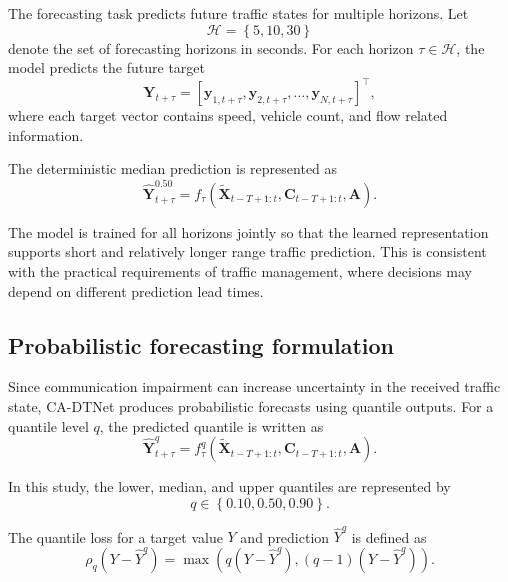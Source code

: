 \documentclass[pdflatex,sn-mathphys-num]{sn-jnl}%
\theoremstyle{thmstyleone}%
\theoremstyle{thmstyletwo}%
\theoremstyle{thmstylethree}%
\begin{document}
The forecasting task predicts future traffic states for multiple horizons. Let
\begin{equation}
    \mathcal{H} = \left\{5, 10, 30\right\}
\end{equation}
denote the set of forecasting horizons in seconds. For each horizon \(\tau \in \mathcal{H}\), the model predicts the future target
\begin{equation}
    \mathbf{Y}_{t+\tau}
    =
    \left[
    \mathbf{y}_{1,t+\tau},
    \mathbf{y}_{2,t+\tau},
    \ldots,
    \mathbf{y}_{N,t+\tau}
    \right]^{\top},
\end{equation}
where each target vector contains speed, vehicle count, and flow related information.

The deterministic median prediction is represented as
\begin{equation}
    \widehat{\mathbf{Y}}_{t+\tau}^{0.50}
    =
    f_{\tau}
    \left(
    \widetilde{\mathbf{X}}_{t-T+1:t},
    \mathbf{C}_{t-T+1:t},
    \mathbf{A}
    \right).
\end{equation}

The model is trained for all horizons jointly so that the learned representation supports short and relatively longer range traffic prediction. This is consistent with the practical requirements of traffic management, where decisions may depend on different prediction lead times.

\subsection{Probabilistic forecasting formulation}

Since communication impairment can increase uncertainty in the received traffic state, CA-DTNet produces probabilistic forecasts using quantile outputs. For a quantile level \(q\), the predicted quantile is written as
\begin{equation}
    \widehat{\mathbf{Y}}_{t+\tau}^{q}
    =
    f_{\tau}^{q}
    \left(
    \widetilde{\mathbf{X}}_{t-T+1:t},
    \mathbf{C}_{t-T+1:t},
    \mathbf{A}
    \right).
\end{equation}

In this study, the lower, median, and upper quantiles are represented by
\begin{equation}
    q \in \left\{0.10, 0.50, 0.90\right\}.
\end{equation}

The quantile loss for a target value \(Y\) and prediction \(\widehat{Y}^{q}\) is defined as
\begin{equation}
    \rho_{q}
    \left(
    Y - \widehat{Y}^{q}
    \right)
    =
    \max
    \left(
    q
    \left(
    Y - \widehat{Y}^{q}
    \right),
    \left(q-1\right)
    \left(
    Y - \widehat{Y}^{q}
    \right)
    \right).
\end{equation}
\end{document}
